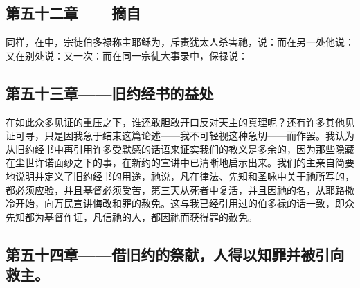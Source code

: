 
\subsection{第五十二章——摘自}

同样，在中，宗徒伯多禄称主耶稣为，斥责犹太人杀害祂，说：而在另一处他说：又在别处说：又一次：而在同一宗徒大事录中，保禄说：\par


\subsection{第五十三章——旧约经书的益处}

在如此众多见证的重压之下，谁还敢胆敢开口反对天主的真理呢？还有许多其他见证可寻，只是因我急于结束这篇论述——我不可轻视这种急切——而作罢。我认为从旧约经书中再引用许多受默感的话语来证实我们的教义是多余的，因为那些隐藏在尘世许诺面纱之下的事，在新约的宣讲中已清晰地启示出来。我们的主亲自简要地说明并定义了旧约经书的用途，祂说，凡在律法、先知和圣咏中关于祂所写的，都必须应验，并且基督必须受苦，第三天从死者中复活，并且因祂的名，从耶路撒冷开始，向万民宣讲悔改和罪的赦免。这与我已经引用过的伯多禄的话一致，即众先知都为基督作证，凡信祂的人，都因祂而获得罪的赦免。\par


\subsection{第五十四章——借旧约的祭献，人得以知罪并被引向救主。}

